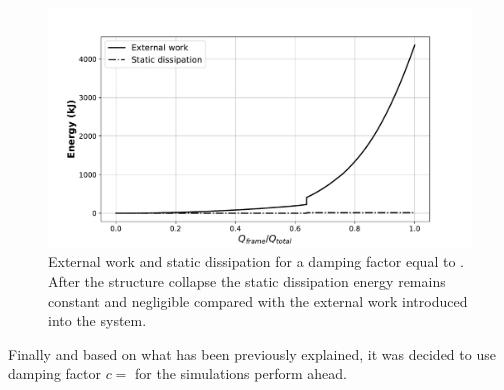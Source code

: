     \begin{figure}[!htpb]
      \centering
      \includegraphics[width=0.8 \textwidth]{../figures/result-model/energy_damp-9}
      \caption[External work and static dissipation for a damping factor equal to ]{External work and static dissipation for a damping factor equal to . After the structure collapse the static dissipation energy remains constant and negligible compared with the external work introduced into the system.}\label{fig:energy_damp-9}
    \end{figure}

    Finally and based on what has been previously explained, it was decided to use damping factor $c =$ for the simulations perform ahead.

  \clearpage
